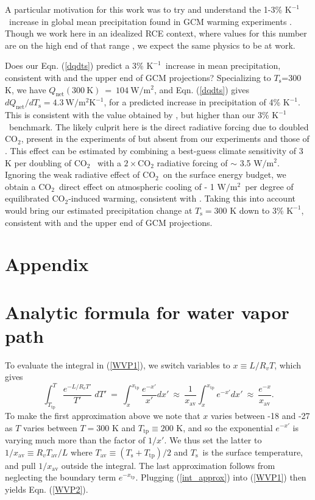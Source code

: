 \documentclass[10pt]{article}
\newcommand{\beqn}{\begin{equation}}
\newcommand{\eeqn}{\end{equation}}
\newcommand{\eqnref}[1]{(\ref{#1})}
\newcommand{\cotwo}{\ensuremath{\mathrm{CO_2}}}
\newcommand{\Qnet}{\ensuremath{Q_\mathrm{net}}}
\newcommand{\Wmsq}{\ensuremath{\mathrm{W/m^2}}}
\newcommand{\Tav}{\ensuremath{T_\mathrm{av}}}
\newcommand{\Ts}{\ensuremath{T_\mathrm{s}}}
\newcommand{\Ttp}{\ensuremath{T_\mathrm{tp}}}
\newcommand{\Kinverse}{\ensuremath{\mathrm{K^{-1}}}}
\begin{document}
A particular motivation for this work was to try and understand the 1-3\% \Kinverse\ increase in global mean precipitation found in GCM warming experiments \citep{lambert2008,held2006}. Though we work here in an idealized RCE context, where values for this number are on the high end of that range \citep[e.g. the 3\% \Kinverse\ found by][]{romps2011}, we expect the same physics to be at work. 

Does our Eqn. \eqnref{dqdts} predict a 3\% \Kinverse\ increase in mean precipitation, consistent with \cite{romps2011} and the upper end of GCM projections? Specializing to \Ts=300 K, we have $\Qnet(300\ \mathrm{K})\ =\  104\ \Wmsq$, and Eqn. \eqnref{dqdts} gives $d\Qnet/d\Ts = 4.3 \ \Wmsq\Kinverse$, for a predicted increase in precipitation of 4\% \Kinverse. This is consistent with the value obtained by \cite{muller2011b}, but higher than our  3\% \Kinverse\  benchmark. The likely culprit here is the direct radiative forcing due to doubled \cotwo, present in the experiments of \cite{romps2011} but absent from our experiments and those of \cite{muller2011b}. This effect can be estimated by combining  a best-guess climate sensitivity of 3 K per doubling of \cotwo\ \citep{ipccspm2013} with a $2 \times \cotwo$ radiative forcing of $\sim$ 3.5 \Wmsq. Ignoring the weak radiative effect of \cotwo\ on the surface energy budget, we obtain a \cotwo\ direct effect on atmospheric cooling of  - 1 \Wmsq\ per degree of equilibrated \cotwo-induced warming, consistent with  \cite{pendergrass2014}. Taking this into account would bring our estimated precipitation change at $\Ts=300$ K down to 3\% \Kinverse, consistent with \cite{romps2011} and the upper end of GCM projections.


\section*{Appendix}
\appendix
	\section{Analytic formula for water vapor path}		
	To evaluate the integral in \eqnref{WVP1}, we switch variables to $x\equiv L/R_v T$, which gives
	\beqn
		\int^T_{\Ttp} \frac{e^{-L/R_v T'}}{T'}\; dT' \ = \ \int_x^{x_\mathrm{tp}} \frac{e^{-x'}}{x'} dx' \ \approx\ \frac{1}{x_{\mathrm{av}}}\int_x^{x_\mathrm{tp}} e^{-x'} dx' \ \approx\ \frac{e^{-x}}{x_{\mathrm{av}}}.
		\label{int_approx}
	\eeqn
To make the first approximation above we note that $x$ varies between -18 and -27 as $T$ varies between $T=300$ K and $\Ttp \equiv  200$ K, and so the exponential $e^{-x'}$ is varying much more than the factor of $1/x'$. We thus set the latter  to $1/x_{\mathrm{av}}\equiv R_v \Tav/L$ where $\Tav \equiv (\Ts + \Ttp)/2$ and \Ts\ is the surface temperature, and pull $1/x_{\mathrm{av}}$ outside the integral. The last approximation follows from neglecting the boundary term $e^{-x_\mathrm{tp}}$. Plugging \eqnref{int_approx} into \eqnref{WVP1} then yields Eqn. \eqnref{WVP2}. 
 
\end{document}
